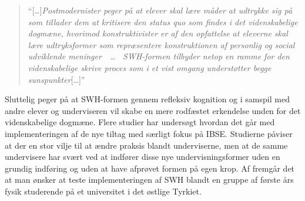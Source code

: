\begin{quote}
``[\ldots]\emph{Postmodernister peger på at elever skal lære måder at udtrykke sig på som tillader dem at kritisere den status quo som findes i det videnskabelige dogmæne, hvorimod konstruktivister er af den opfattelse at eleverne skal lære udtryksformer som repræsentere konstruktionen af personlig og social udviklende meninger\, ~\ldots~ SWH-formen tilbyder netop en ramme for den videnskabelige skrive proces som i et vist omgang understøtter begge sunspunkter}[\ldots]''
\end{quote}
Sluttelig peger \citep{Keys1999} på at SWH-formen gennem refleksiv kognition og i samspil med andre elever og underviseren vil skabe en mere rodfæstet erkendelse unden for det videnskabelige dogmæne.  Flere studier \citep[m.fl.]{Akkus2007, Burke2005} har undersøgt hvordan det går med implementeringen af de nye tiltag med særligt fokus på IBSE. Studierne påviser at der en stor vilje til at ændre praksis blandt underviserne, men at de samme undervisere har svært ved at indfører disse nye undervisningsformer uden en grundig indføring og uden at have afprøvet formen på egen krop. Af \citep{Erkol2010} fremgår det at man ønsker at teste implementeringen af SWH blandt en gruppe af første års fysik studerende på et universitet i det østlige Tyrkiet. 